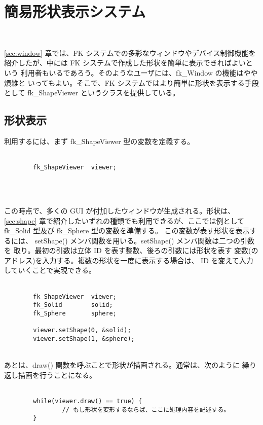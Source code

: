 \chapter{簡易形状表示システム} \label{sec:viewer} ~

\ref{sec:window} 章では、FK システムでの多彩なウィンドウやデバイス制御機能を
紹介したが、中には FK システムで作成した形状を簡単に表示できればよいという
利用者もいるであろう。そのようなユーザには、fk\_Window の機能はやや煩雑と
いってもよい。そこで、FK システムではより簡単に形状を表示する手段として
fk\_ShapeViewer というクラスを提供している。

\section{形状表示}
利用するには、まず fk\_ShapeViewer 型の変数を定義する。\\ ~ \\
\begin{screen}
\begin{verbatim}
        fk_ShapeViewer  viewer;
\end{verbatim}
\end{screen}
\\ ~

この時点で、多くの GUI が付加したウィンドウが生成される。形状は、
\ref{sec:shape} 章で紹介したいずれの種類でも利用できるが、ここでは例として
fk\_Solid 型及び fk\_Sphere 型の変数を準備する。
この変数が表す形状を表示するには、
setShape() メンバ関数を用いる。setShape() メンバ関数は二つの引数を
取り。最初の引数は立体 ID を表す整数、後ろの引数には形状を表す
変数(のアドレス)を入力する。複数の形状を一度に表示する場合は、
ID を変えて入力していくことで実現できる。\\ ~ \\
\begin{breakbox}
\begin{verbatim}
        fk_ShapeViewer  viewer;
        fk_Solid        solid;
        fk_Sphere       sphere;

        viewer.setShape(0, &solid);
        viewer.setShape(1, &sphere);
\end{verbatim}
\end{breakbox}
~ \\

あとは、draw() 関数を呼ぶことで形状が描画される。通常は、次のように
繰り返し描画を行うことになる。\\ ~ \\
\begin{breakbox}
\begin{verbatim}
        while(viewer.draw() == true) {
                // もし形状を変形するならば、ここに処理内容を記述する。
        }
\end{verbatim}
\end{breakbox}
~ \\


